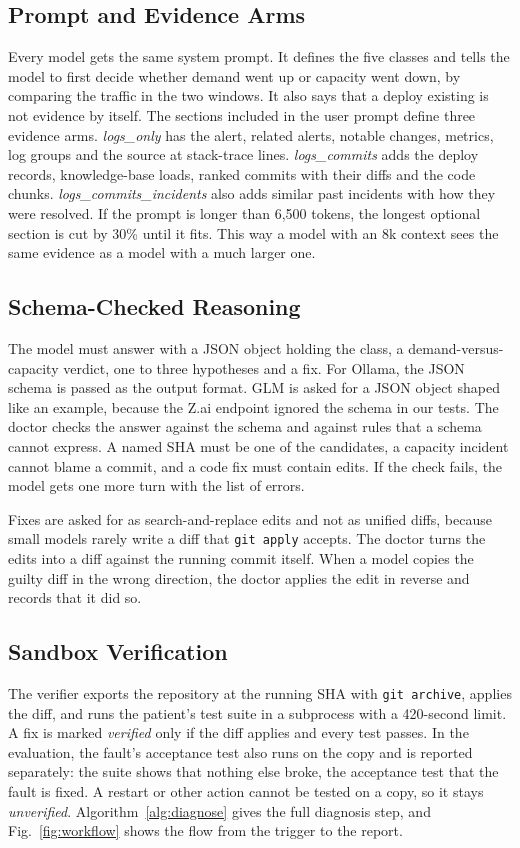 \documentclass[12pt,onecolumn,draftclsnofoot]{IEEEtran}
\begin{document}
\subsection{Prompt and Evidence Arms}
Every model gets the same system prompt. It defines the five classes and tells the model to first decide whether demand went up or capacity went down, by comparing the traffic in the two windows. It also says that a deploy existing is not evidence by itself. The sections included in the user prompt define three evidence arms. \emph{logs\_only} has the alert, related alerts, notable changes, metrics, log groups and the source at stack-trace lines. \emph{logs\_commits} adds the deploy records, knowledge-base loads, ranked commits with their diffs and the code chunks. \emph{logs\_commits\_incidents} also adds similar past incidents with how they were resolved. If the prompt is longer than 6,500 tokens, the longest optional section is cut by 30\% until it fits. This way a model with an 8k context sees the same evidence as a model with a much larger one.

\subsection{Schema-Checked Reasoning}
The model must answer with a JSON object holding the class, a demand-versus-capacity verdict, one to three hypotheses and a fix. For Ollama, the JSON schema is passed as the output format. GLM is asked for a JSON object shaped like an example, because the Z.ai endpoint ignored the schema in our tests. The doctor checks the answer against the schema and against rules that a schema cannot express. A named SHA must be one of the candidates, a capacity incident cannot blame a commit, and a code fix must contain edits. If the check fails, the model gets one more turn with the list of errors.

Fixes are asked for as search-and-replace edits and not as unified diffs, because small models rarely write a diff that \texttt{git apply} accepts. The doctor turns the edits into a diff against the running commit itself. When a model copies the guilty diff in the wrong direction, the doctor applies the edit in reverse and records that it did so.

\subsection{Sandbox Verification}
The verifier exports the repository at the running SHA with \texttt{git archive}, applies the diff, and runs the patient's test suite in a subprocess with a 420-second limit. A fix is marked \emph{verified} only if the diff applies and every test passes. In the evaluation, the fault's acceptance test also runs on the copy and is reported separately: the suite shows that nothing else broke, the acceptance test that the fault is fixed. A restart or other action cannot be tested on a copy, so it stays \emph{unverified}. Algorithm~\ref{alg:diagnose} gives the full diagnosis step, and Fig.~\ref{fig:workflow} shows the flow from the trigger to the report.
\end{document}
